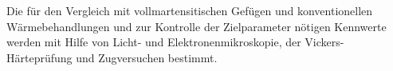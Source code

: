 Die für den Vergleich mit vollmartensitischen Gefügen und konventionellen Wärmebehandlungen und zur Kontrolle der Zielparameter nötigen Kennwerte werden mit Hilfe von Licht- und Elektronenmikroskopie, der Vickers-Härteprüfung und Zugversuchen bestimmt. 






